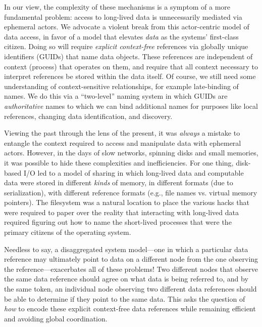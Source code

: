 In our view, the complexity of these mechanisms is a symptom of a more fundamental problem: access to long-lived data
is unnecessarily mediated via ephemeral actors.
We advocate a violent break from this actor-centric model of data access, in favor of a model that elevates \emph{data}
as the systems' first-class citizen.  Doing so will require \emph{explicit
    context-free} references via globally unique identifiers (GUIDs) that name data objects. These
references are independent of context (\eg process) that operates on them, and require that all context necessary to interpret references
be stored within the data itself. Of course, we still need some understanding of
context-sensitive relationships, for example late-binding of names. We do this via a
``two-level'' naming system in which GUIDs are \emph{authoritative} names to which we can bind
additional names for purposes like local references, changing data identification, and discovery.

Viewing the past through the lens of the present, it was \emph{always} a mistake to entangle the context required to access
and manipulate data with ephemeral actors.  However, in the days of slow networks, spinning disks and small memories,
it was possible to hide these complexities and inefficiencies.  For one thing, disk-based I/O led to a model of sharing in
which long-lived data and computable data were stored in different \emph{kinds} of memory, in different formats (due to serialization),
with different reference formats (e.g., file names vs. virtual memory pointers).
The filesystem was a natural location to place the various hacks that were required to paper over the reality
that interacting with long-lived data required figuring out how to name the short-lived processes that were the primary
citizens of the operating system.

Needless to say, a disaggregated system model---one in which a particular data reference may
ultimately point to data on a different node from the one observing the reference---exacerbates all of these problems!
Two different nodes that observe the same data reference should agree on what data is
being referred to, and by the same token, an individual node observing two different data references
should be able to determine if they point to the same data. This asks the question of \emph{how}
to encode these explicit context-free data references while remaining efficient and avoiding global
coordination.


